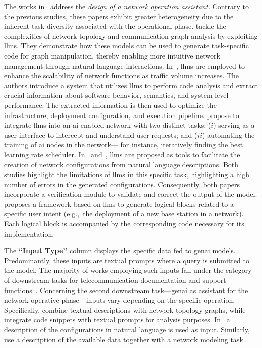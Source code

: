 %
The works in~\cite{mani2023enhancing, ghasemirahni2024deploying, duclos2024utilizing, wang2023making, mondal2023llms, ayed2024hermes} address the \emph{design of a network operation assistant.}
%
Contrary to the previous studies, these papers exhibit greater heterogeneity due to the inherent task diversity associated with the operational phase.
\citet{mani2023enhancing} tackle the complexities of network topology and communication graph analysis by exploiting \glspl{llm}. 
They demonstrate how these models can be used to generate task-specific code for graph manipulation, thereby enabling more intuitive network management through natural language interactions.
In~\cite{ghasemirahni2024deploying}, \glspl{llm} are employed to enhance the scalability of 
network functions
as traffic volume increases.
The authors introduce a system that utilizes \glspl{llm} to perform code analysis and extract crucial information about software behavior, semantics, and system-level performance. 
The extracted information is then used to optimize the infrastructure, deployment configuration, and execution pipeline.
\citet{shen2024large} propose to integrate \glspl{llm} into an \gls{ai}-enabled network with two distinct tasks: 
($i$) serving as a user interface to intercept and understand user requests; and 
($ii$) automating the training of \gls{ai} nodes in the network---%
for instance, iteratively finding the best learning rate scheduler.
In~\cite{wang2023making} and~\cite{mondal2023llms}, \glspl{llm} are proposed as tools to facilitate the creation of network configurations from natural language descriptions.
Both studies highlight the limitations of \glspl{llm} in this specific task, highlighting a high number of errors in the generated configurations. 
Consequently, both papers incorporate a verification module to validate and correct the output of the model.
%
\citet{ayed2024hermes} proposes a framework based on \glspl{llm} to generate logical blocks related to a specific user intent (e.g.,~the deployment of a new base station in a network). Each logical block is accompanied by the corresponding code necessary for its implementation.
%



The \textbf{``Input Type''} column displays the specific data fed to \gls{genai} models.
Predominantly, these inputs are textual prompts where a query is submitted to the model.
%
The majority of works employing such inputs fall under the category of downstream tasks for telecommunication documentation and support functions~\cite{soman2023observations, roychowdhury2024unlocking, shen2024large, duclos2024utilizing, ahmed2024linguistic, piovesan2024telecom, karapantelakis2024using, erak2024leveraging}.
%
Concerning the second downstream task---\ie \gls{genai} as assistant for the network operative phase---inputs vary depending on the specific operation. 
Specifically, 
\citet{mani2023enhancing} combine textual descriptions with network topology graphs, while \citet{ghasemirahni2024deploying} integrate code snippets with textual prompts for analysis purposes.
In~\cite{wang2023making, mondal2023llms} a description of the configurations in natural language is used as input.
%
Similarly, \citet{ayed2024hermes} use a description of the available data together with a network modeling task.
%


